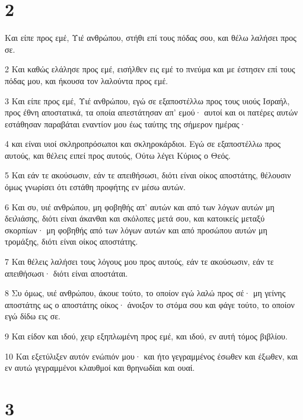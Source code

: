 \chapter{2}

\par Και είπε προς εμέ, Υιέ ανθρώπου, στήθι επί τους πόδας σου, και θέλω λαλήσει προς σε.
\par 2 Και καθώς ελάλησε προς εμέ, εισήλθεν εις εμέ το πνεύμα και με έστησεν επί τους πόδας μου, και ήκουσα τον λαλούντα προς εμέ.
\par 3 Και είπε προς εμέ, Υιέ ανθρώπου, εγώ σε εξαποστέλλω προς τους υιούς Ισραήλ, προς έθνη αποστατικά, τα οποία απεστάτησαν απ' εμού· αυτοί και οι πατέρες αυτών εστάθησαν παραβάται εναντίον μου έως ταύτης της σήμερον ημέρας·
\par 4 και είναι υιοί σκληροπρόσωποι και σκληροκάρδιοι. Εγώ σε εξαποστέλλω προς αυτούς, και θέλεις ειπεί προς αυτούς, Ούτω λέγει Κύριος ο Θεός.
\par 5 Και εάν τε ακούσωσιν, εάν τε απειθήσωσι, διότι είναι οίκος αποστάτης, θέλουσιν όμως γνωρίσει ότι εστάθη προφήτης εν μέσω αυτών.
\par 6 Και συ, υιέ ανθρώπου, μη φοβηθής απ' αυτών και από των λόγων αυτών μη δειλιάσης, διότι είναι άκανθαι και σκόλοπες μετά σου, και κατοικείς μεταξύ σκορπίων· μη φοβηθής από των λόγων αυτών και από προσώπου αυτών μη τρομάξης, διότι είναι οίκος αποστάτης.
\par 7 Και θέλεις λαλήσει τους λόγους μου προς αυτούς, εάν τε ακούσωσιν, εάν τε απειθήσωσι· διότι είναι αποστάται.
\par 8 Συ όμως, υιέ ανθρώπου, άκουε τούτο, το οποίον εγώ λαλώ προς σέ· μη γείνης αποστάτης ως ο αποστάτης οίκος· άνοιξον το στόμα σου και φάγε τούτο, το οποίον εγώ δίδω εις σε.
\par 9 Και είδον και ιδού, χειρ εξηπλωμένη προς εμέ, και ιδού, εν αυτή τόμος βιβλίου.
\par 10 Και εξετύλιξεν αυτόν ενώπιόν μου· και ήτο γεγραμμένος έσωθεν και έξωθεν, και εν αυτώ γεγραμμένοι κλαυθμοί και θρηνωδίαι και ουαί.

\chapter{3}

